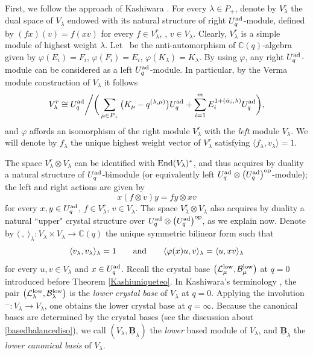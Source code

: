 \documentclass[10pt,a4paper]{amsart}
\numberwithin{equation}{section}
\theoremstyle{definition}
\newcommand{\mc}{\mathbb{C}}
\newcommand{\Ll}{{\mathcal L}}
\newcommand{\ra}{\rightarrow}
\begin{document}
First, we follow the approach of Kashiwara \cite{Kashiwara2,Kashiwara3}. For every $\lambda\in P_+$, denote by $V_\lambda^r$ the dual space of $V_\lambda$ endowed with its natural structure of right $U_q^{\rm ad}$-module, defined by ${(f x)(v) = f(xv)}$
for every $f\in V_\lambda^r$, , $v\in V_\lambda$.
Clearly, $V_\lambda^r$ is a simple module of highest weight $\lambda$.
 Let~\smash{$\varphi\colon U_q^{\rm ad} \ra U_q^{\rm ad}$} be the anti-automorphism of $\mc(q)$-algebra given by $\varphi(E_i) = F_i$, $\varphi(F_i) = E_i$, $\varphi(K_\lambda) = K_{\lambda}$. By using $\varphi$, any right $U_q^{\rm ad}$-module can be considered as a left $U_q^{\rm ad}$-module. In particular, by the Verma module construction of $V_\lambda$ it follows
\[V_\lambda^r \cong U_q^{\rm ad}\bigg/\bigg(\sum_{\mu\in P_+} \big(K_\mu -q^{(\lambda,\mu)}\big)U_q^{\rm ad}+ \sum_{i=1}^m E_i^{1+(\check{\alpha}_i,\lambda)}U_q^{\rm ad}\bigg),\]
and $\varphi$ affords an isomorphism of the right module $V_\lambda^r$ with the {\it left} module $V_\lambda$. We will denote by $f_\lambda$ the unique highest weight vector of $V_\lambda^r$ satisfying $\langle f_\lambda,v_\lambda\rangle = 1$.

The space $V_\lambda^r \otimes V_\lambda$ can be identified with ${\rm End}(V_\lambda)^*$, and thus acquires by duality a natural structure of $U_q^{\rm ad}$-bimodule \big(or equivalently left $U_q^{\rm ad} \otimes \big(U_q^{\rm ad}\big)^{\rm op}$-module\big); the left and right actions are given by
\begin{equation}\label{bimodaction}x(f \otimes v)y = fy \otimes xv
\end{equation}
for every $x,y\in U_q^{\rm ad}$, $f\in V_\lambda^r$, $v\in V_\lambda$. The space $V_\lambda^r \otimes V_\lambda$ also acquires by duality a natural ``upper" crystal structure over $U_q^{\rm ad} \otimes \big(U_q^{\rm ad}\big)^{\rm op}$, as we explain now. Denote by $\langle \ ,\ \rangle_\lambda \colon V_\lambda \times V_\lambda \ra \mc(q)$ the unique symmetric bilinear form such that
\begin{equation}\label{proppairinglambda}
\langle v_\lambda,v_\lambda\rangle_\lambda =1\qquad{\rm and}\qquad \langle \varphi(x)u,v\rangle_\lambda = \langle u, xv\rangle_\lambda
\end{equation}
for every $u,v\in V_\lambda$ and $x\in U_q^{\rm ad}$. Recall the crystal base $\big(\Ll_\mu^{\rm low},\mathcal{B}_\mu^{\rm low}\big)$ at $q=0$ introduced before Theorem \ref{Kashiuniqueteo}. In Kashiwara's terminology \cite{Kashiwara1, Kashiwara2}, the pair $\big(\Ll_{\lambda}^{\rm low},\mathcal{B}_\lambda^{\rm low}\big)$ is the {\it lower crystal base} of $V_\lambda$ at $q=0$. Applying the involution ${}^-\colon V_\lambda\ra V_\lambda$, one obtains the lower crystal base \smash{$\big(\overline{\Ll_{\lambda}^{\rm low}},\overline{\mathcal{B}_\lambda^{\rm low}}\big)$} at $q=\infty$. Because the canonical bases are determined by the crystal bases (see the discussion about \eqref{basedbalancediso}), we call $(V_\lambda,\underline{\mathbf{B}}_\lambda)$ the {\it lower} based module of $V_\lambda$, and $\underline{\mathbf{B}}_\lambda$ the {\it lower canonical basis} of $V_\lambda$.
\end{document}
